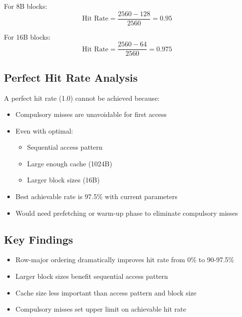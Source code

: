 \documentclass{article}
\begin{document}
For 8B blocks:
\begin{equation*}
    \text{Hit Rate} = \frac{2560 - 128}{2560} = 0.95
\end{equation*}

For 16B blocks:
\begin{equation*}
    \text{Hit Rate} = \frac{2560 - 64}{2560} = 0.975
\end{equation*}

\subsection{Perfect Hit Rate Analysis}
A perfect hit rate (1.0) cannot be achieved because:
\begin{itemize}
    \item Compulsory misses are unavoidable for first access
    \item Even with optimal:
    \begin{itemize}
        \item Sequential access pattern
        \item Large enough cache (1024B)
        \item Larger block sizes (16B)
    \end{itemize}
    \item Best achievable rate is 97.5\% with current parameters
    \item Would need prefetching or warm-up phase to eliminate compulsory misses
\end{itemize}

\subsection{Key Findings}
\begin{itemize}
    \item Row-major ordering dramatically improves hit rate from 0\% to 90-97.5\%
    \item Larger block sizes benefit sequential access pattern
    \item Cache size less important than access pattern and block size
    \item Compulsory misses set upper limit on achievable hit rate
\end{itemize}
\end{document}
